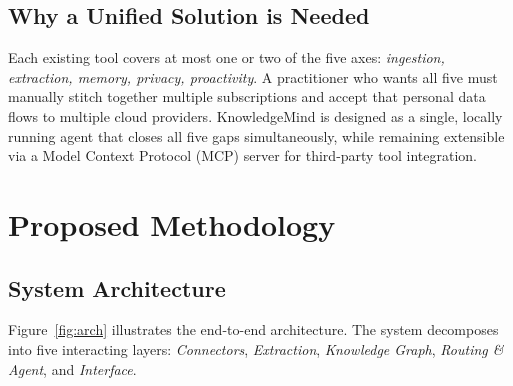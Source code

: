 \documentclass[10pt,twocolumn]{article}
\begin{document}
\subsection{Why a Unified Solution is Needed}

Each existing tool covers at most one or two of the five axes:
\emph{ingestion, extraction, memory, privacy, proactivity}.
A practitioner who wants all five must manually stitch together multiple
subscriptions and accept that personal data flows to multiple cloud providers.
KnowledgeMind is designed as a single, locally running agent that closes all
five gaps simultaneously, while remaining extensible via a Model Context
Protocol (MCP) server for third-party tool integration.

\section{Proposed Methodology}

\subsection{System Architecture}

Figure~\ref{fig:arch} illustrates the end-to-end architecture.
The system decomposes into five interacting layers:
\emph{Connectors}, \emph{Extraction}, \emph{Knowledge Graph},
\emph{Routing \& Agent}, and \emph{Interface}.
\end{document}

